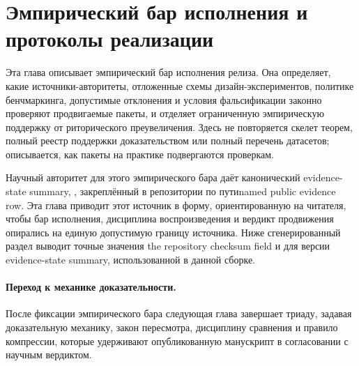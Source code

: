 \section{Эмпирический бар исполнения и протоколы реализации}
\label{sec:oc-core-1-3-empirical-execution-protocols}

Эта глава описывает эмпирический бар исполнения релиза. Она определяет, какие
источники-авторитеты, отложенные схемы дизайн-экспериментов, политике
бенчмаркинга, допустимые отклонения и условия фальсификации законно
проверяют продвигаемые пакеты, и отделяет ограниченную эмпирическую
поддержку от риторического преувеличения. Здесь не повторяется
скелет теорем, полный реестр поддержки доказательством или полный перечень
датасетов; описывается, как пакеты на практике подвергаются проверкам.

Научный авторитет для этого эмпирического бара даёт канонический
evidence-state summary, , закреплённый в репозитории
по путиnamed public evidence row.
Эта глава приводит этот источник в форму, ориентированную на читателя, чтобы
бар исполнения, дисциплина воспроизведения и вердикт продвижения опирались на
единую допустимую границу источника. Ниже сгенерированный раздел выводит
точные значения the repository checksum field и 
для версии evidence-state summary, использованной в данной сборке.

\begingroup
\small

\endgroup

\paragraph{Переход к механике доказательности.}
После фиксации эмпирического бара следующая глава завершает триаду, задавая
доказательную механику, закон пересмотра, дисциплину сравнения и правило
компрессии, которые удерживают опубликованную манускрипт в согласовании с
научным вердиктом.
